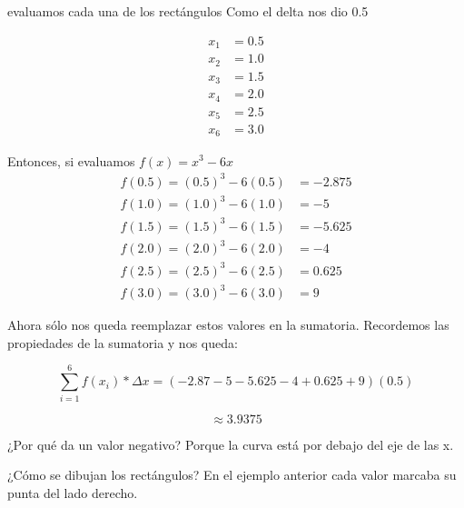 \documentclass[presentation]{beamer}
\begin{document}
\begin{frame}[label=sec-13]{evaluamos cada una de los rectángulos}
Como el delta nos dio 0.5

\begin{equation}
\begin{split}
x_{1} &= 0.5 \\
x_{2} &= 1.0 \\
x_{3} &= 1.5 \\
x_{4} &= 2.0 \\
x_{5} &= 2.5 \\
x_{6} &=  3.0
\end{split}
\end{equation}
\end{frame}

\begin{frame}[label=sec-14]{}
Entonces, si evaluamos \(f(x) = x^3 - 6x\) 
\begin{equation}
\begin{split}
 f(0.5) = (0.5)^3 - 6(0.5)  &= -2.875 \\
 f(1.0) = (1.0)^3 - 6(1.0)  &= -5 \\
 f(1.5) = (1.5)^3 - 6(1.5) &= -5.625 \\
 f(2.0) = (2.0)^3 - 6(2.0) &= -4 \\
 f(2.5) = (2.5)^3 - 6(2.5)  &= 0.625 \\
 f(3.0) = (3.0)^3 - 6(3.0)  &=  9
\end{split}
\end{equation}

Ahora sólo nos queda reemplazar estos valores en la sumatoria. 
Recordemos las propiedades de la sumatoria y nos queda: 

\[\sum_{i=1}^{6}f(x_{i}) * \Delta x = (-2.87 - 5 - 5.625 - 4 + 0.625 + 9)(0.5) \]


\[ \approx  3.9375 \]

\begin{block}{¿Por qué da un valor negativo?}
Porque la curva está por debajo del eje de las x. 
\end{block}
\end{frame}

\begin{frame}[label=sec-15]{¿Cómo se dibujan los rectángulos?}
En el ejemplo anterior cada valor marcaba su punta del lado derecho. 
\end{frame}
\end{document}
